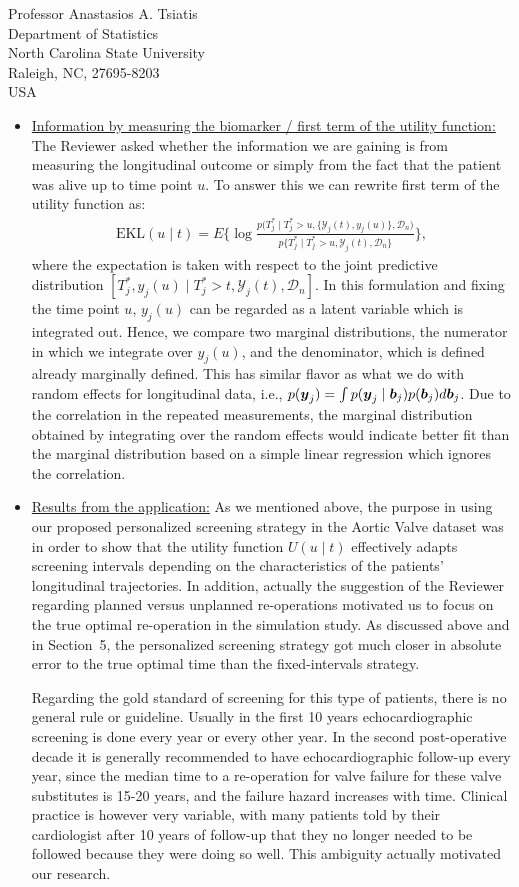 \documentclass[a4paper, 11pt]{letter}
\newcommand{\by}{\mbox{{\boldmath $y$}}}
\newcommand{\bb}{\mbox{{\boldmath $b$}}}
\begin{document}
\begin{letter}{Professor Anastasios A. Tsiatis\\
Department of Statistics\\
North Carolina State University\\
Raleigh, NC, 27695-8203\\
USA}
\begin{itemize}
\item \underline{Information by measuring the biomarker / first term of the utility function:} The Reviewer asked whether the information we are gaining is from measuring the longitudinal outcome or simply from the fact that the patient was alive up to time point $u$. To answer this we can rewrite first term of the utility function as:
    \begin{eqnarray*}
    \mbox{EKL}(u \mid t) = E \biggl \{ \log \frac{p \bigl (T_j^* \mid T_j^* > u, \bigl \{ \mathcal Y_j(t), y_j(u) \bigr \}, \mathcal D_n \bigr )}{p\{T_j^* \mid T_j^* > u, \mathcal Y_j(t), \mathcal D_n\}} \biggr \},
    \end{eqnarray*}
    where the expectation is taken with respect to the joint predictive distribution $[T_j^*, y_j(u) \mid T_j^* > t, \mathcal Y_j(t), \mathcal D_n]$. In this formulation and fixing the time point $u$, $y_j(u)$ can be regarded as a latent variable which is integrated out. Hence, we compare two marginal distributions, the numerator in which we integrate over $y_j(u)$, and the denominator, which is defined already marginally defined. This has similar flavor as what we do with random effects for longitudinal data, i.e., $p(\by_j) = \int p(\by_j \mid \bb_j) p(\bb_j) d\bb_j$. Due to the correlation in the repeated measurements, the marginal distribution obtained by integrating over the random effects would indicate better fit than the marginal distribution based on a simple linear regression which ignores the correlation.

\item \underline{Results from the application:} As we mentioned above, the purpose in using our proposed personalized screening strategy in the Aortic Valve dataset was in order to show that the utility function $U(u \mid t)$ effectively adapts screening intervals depending on the characteristics of the patients' longitudinal trajectories. In addition, actually the suggestion of the Reviewer regarding planned versus unplanned re-operations motivated us to focus on the true optimal re-operation in the simulation study. As discussed above and in Section~5, the personalized screening strategy got much closer in absolute error to the true optimal time than the fixed-intervals strategy.

    Regarding the gold standard of screening for this type of patients,  there is no general rule or guideline. Usually in the first 10 years echocardiographic screening is done every year or every other year. In the second post-operative decade it is generally recommended to have echocardiographic follow-up every year, since the median time to a re-operation for valve failure for these valve substitutes is 15-20 years, and the failure hazard increases with time. Clinical practice is however very variable, with many patients told by their cardiologist after 10 years of follow-up that they no longer needed to be followed because they were doing so well. This ambiguity actually motivated our research.
\end{itemize}
\end{letter}
\end{document}
